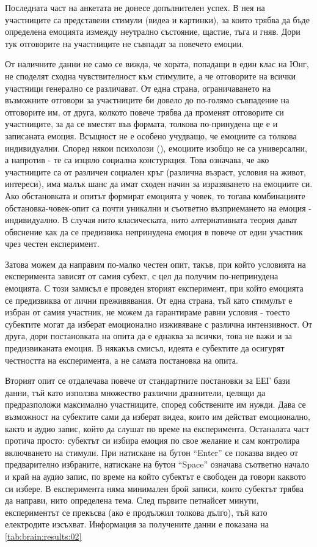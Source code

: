 \documentclass[main.tex]{subfiles}
\begin{document}
Последната част на анкетата не донесе допълнителен успех. В нея на участниците са представени стимули (видеа и картинки), за които трябва да бъде определена емоцията измежду неутрално състояние, щастие, тъга и гняв. Дори тук отговорите на участниците не съвпадат за повечето емоции.

От наличните данни не само се вижда, че хората, попадащи в един клас на Юнг, не споделят сходна чувствителност към стимулите, а че отговорите на всички участници генерално се различават. От една страна, ограничаването на възможните отговори за участниците би довело до по-голямо съвпадение на отговорите им, от друга, колкото повече трябва да променят отговорите си участниците, за да се вместят във формата, толкова по-принудена ще е и записаната емоция. Всъщност не е особено учудващо, че емоциите са толкова индивидуални. Според някои психолози (\cite{stupid-book}), емоциите изобщо не са универсални, а напротив - те са изцяло социална констуркция. Това означава, че ако участниците са от различен социален кръг (различна възраст, условия на живот, интереси), има малък шанс да имат сходен начин за изразяването на емоциите си. Ако обстановката и опитът формират емоцията у човек, то тогава комбинациите обстановка-човек-опит са почти уникални и съответно възприемането на емоция - индивидуално. В случая нито класическата, нито алтернативната теория дават обяснение как да се предизвика непринудена емоция в повече от един участник чрез честен експеримент.

Затова можем да направим по-малко честен опит, такъв, при който условията на експеримента зависят от самия субект, с цел да получим по-непринудена емоцията. С този замисъл е проведен вторият експеримент, при който емоцията се предизвиква от лични преживявания. От една страна, тъй като стимулът е избран от самия участник, не можем да гарантираме равни условия - тоесто субектите могат да изберат емоционално изживяване с различна интензивност. От друга, дори постановката на опита да е еднаква за всички, това не важи и за предизвиканата емоция. В някакъв смисъл, идеята е субектите да осигурят честността на експеримента, а не самата постановка на опита.

Вторият опит се отдалечава повече от стандартните постановки за ЕЕГ бази данни, тъй като използва множество различни дразнители, целящи да предразположи максимално участниците, според собствените им нужди. Дава се възможност на субектите сами да изберат видеа, които им действат емоционално, както и аудио запис, който да слушат по време на експеримента. Останалата част протича просто: субектът си избира емоция по свое желание и сам контролира включването на стимули. При натискане на бутон ``Enter'' се показва видео от предварително избраните, натискане на бутон ``Space'' означава съответно начало и край на аудио запис, по време на който субектът е свободен да говори каквото си избере. В експеримента няма минимален брой записи, които субектът трябва да направи, нито определена тема. След първите петнайсет минути, експериментът се прекъсва (ако е продължил толкова дълго), тъй като електродите изсъхват. Информация за получените данни е показана на \autoref{tab:brain:results:02}
\end{document}
